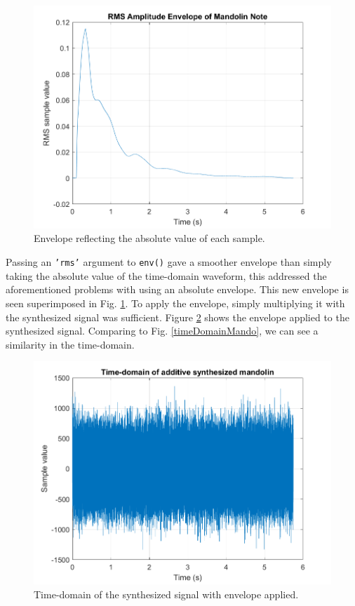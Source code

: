 \documentclass{article}
\begin{document}
            \begin{figure}[H]
                \includegraphics[scale=0.5]{images/envMando.png}%
                \centering
                \caption{Envelope reflecting the absolute value of each sample.}
                \label{envMando}
            \end{figure}
            Passing an \texttt{'rms'} argument to \texttt{env()} gave a smoother envelope than simply taking the absolute value of the time-domain waveform, this addressed the aforementioned problems with using an absolute envelope.
            This new envelope is seen superimposed in Fig. \ref{envMando}.
            To apply the envelope, simply multiplying it with the synthesized signal was sufficient.
            Figure \ref{additiveEnv} shows the envelope applied to the synthesized signal.
            Comparing to Fig. \ref{timeDomainMando}, we can see a similarity in the time-domain.
            \begin{figure}[H]
                \includegraphics[scale=0.5]{images/additiveEnv.png}%
                \centering
                \caption{Time-domain of the synthesized signal with envelope applied.}
                \label{additiveEnv}
            \end{figure}
\end{document}
